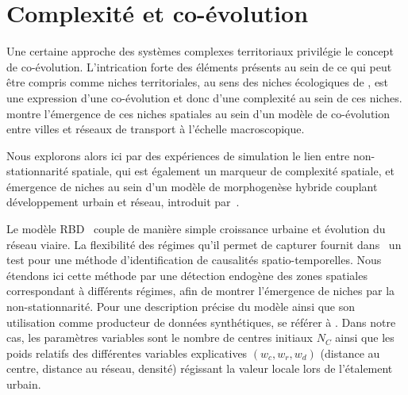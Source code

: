 \documentclass[11pt]{article}
\begin{document}



\section{Complexité et co-évolution}




Une certaine approche des systèmes complexes territoriaux privilégie le concept de co-évolution. L'intrication forte des éléments présents au sein de ce qui peut être compris comme niches territoriales, au sens des niches écologiques de \cite{holland2012signals}, est une expression d'une co-évolution et donc d'une complexité au sein de ces niches. \cite{raimbault2018modeling} montre l'émergence de ces niches spatiales au sein d'un modèle de co-évolution entre villes et réseaux de transport à l'échelle macroscopique.


Nous explorons alors ici par des expériences de simulation le lien entre non-stationnarité spatiale, qui est également un marqueur de complexité spatiale, et émergence de niches au sein d'un modèle de morphogenèse hybride couplant développement urbain et réseau, introduit par~\cite{raimbault2014hybrid}.

Le modèle RBD~\citep{raimbault2014hybrid} couple de manière simple croissance urbaine et évolution du réseau viaire. La flexibilité des régimes qu'il permet de capturer fournit dans~\cite{raimbault2017identification} un test pour une méthode d'identification de causalités spatio-temporelles. Nous étendons ici cette méthode par une détection endogène des zones spatiales correspondant à différents régimes, afin de montrer l'émergence de niches par la non-stationnarité. Pour une description précise du modèle ainsi que son utilisation comme producteur de données synthétiques, se référer à \cite{raimbault2018caracterisation}. Dans notre cas, les paramètres variables sont le nombre de centres initiaux $N_C$ ainsi que les poids relatifs des différentes variables explicatives $(w_c,w_r,w_d)$ (distance au centre, distance au réseau, densité) régissant la valeur locale lors de l'étalement urbain.
\end{document}
